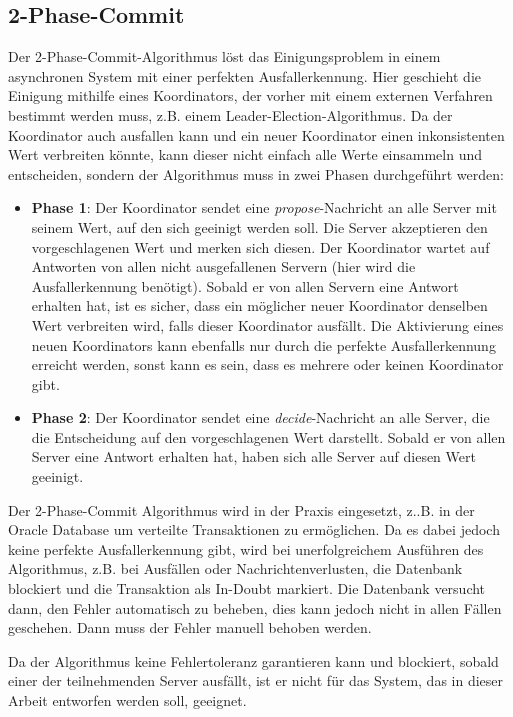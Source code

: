 \subsection{2-Phase-Commit}

Der 2-Phase-Commit-Algorithmus löst das Einigungsproblem in einem asynchronen System mit einer perfekten Ausfallerkennung. Hier geschieht die Einigung mithilfe eines Koordinators, der vorher mit einem externen Verfahren bestimmt werden muss, z.B. einem Leader-Election-Algorithmus. Da der Koordinator auch ausfallen kann und ein neuer Koordinator einen inkonsistenten Wert verbreiten könnte, kann dieser nicht einfach alle Werte einsammeln und entscheiden, sondern der Algorithmus muss in zwei Phasen durchgeführt werden:

\begin{itemize}
	\item \textbf{Phase 1}: Der Koordinator sendet eine \textit{propose}-Nachricht an alle Server mit seinem Wert, auf den sich geeinigt werden soll. Die Server akzeptieren den vorgeschlagenen Wert und merken sich diesen. Der Koordinator wartet auf Antworten von allen nicht ausgefallenen Servern (hier wird die Ausfallerkennung benötigt). Sobald er von allen Servern eine Antwort erhalten hat, ist es sicher, dass ein möglicher neuer Koordinator denselben Wert verbreiten wird, falls dieser Koordinator ausfällt. Die Aktivierung eines neuen Koordinators kann ebenfalls nur durch die perfekte Ausfallerkennung erreicht werden, sonst kann es sein, dass es mehrere oder keinen Koordinator gibt.
	\item \textbf{Phase 2}: Der Koordinator sendet eine \textit{decide}-Nachricht an alle Server, die die Entscheidung auf den vorgeschlagenen Wert darstellt. Sobald er von allen Server eine Antwort erhalten hat, haben sich alle Server auf diesen Wert geeinigt.
\end{itemize}

Der 2-Phase-Commit Algorithmus wird in der Praxis eingesetzt, z..B. in der Oracle Database \cite{oracle-db-2pc} um verteilte Transaktionen zu ermöglichen. Da es dabei jedoch keine perfekte Ausfallerkennung gibt, wird bei unerfolgreichem Ausführen des Algorithmus, z.B. bei Ausfällen oder Nachrichtenverlusten, die Datenbank blockiert und die Transaktion als \glqq In-Doubt \grqq markiert. Die Datenbank versucht dann, den Fehler automatisch zu beheben, dies kann jedoch nicht in allen Fällen geschehen. Dann muss der Fehler manuell behoben werden.

Da der Algorithmus keine Fehlertoleranz garantieren kann und blockiert, sobald einer der teilnehmenden Server ausfällt, ist er nicht für das System, das in dieser Arbeit entworfen werden soll, geeignet. 

